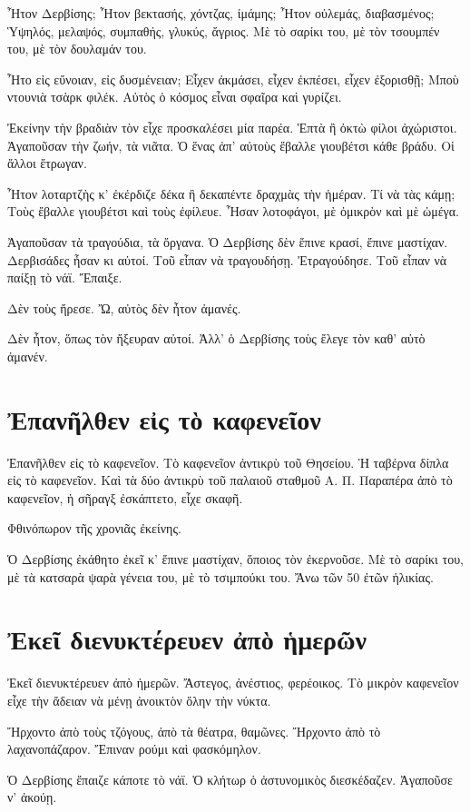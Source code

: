 \documentclass[11pt]{article}
\begin{document}
Ἦτον Δερβίσης; Ἦτον βεκτασής, χόντζας, ἰμάμης; Ἦτον οὐλεμάς, διαβασμένος; Ὑψηλός, μελαψός, συμπαθής, γλυκύς, ἄγριος. Μὲ τὸ σαρίκι του, μὲ τὸν τσουμπέν του, μὲ τὸν δουλαμάν του.

Ἦτο εἰς εὔνοιαν, εἰς δυσμένειαν; Εἶχεν ἀκμάσει, εἶχεν ἐκπέσει, εἶχεν ἐξορισθῇ; Μποὺ ντουνιὰ τσὰρκ φιλέκ. Αὐτὸς ὁ κόσμος εἶναι σφαῖρα καὶ γυρίζει.

Ἐκείνην τὴν βραδιὰν τὸν εἶχε προσκαλέσει μία παρέα. Ἑπτὰ ἢ ὀκτὼ φίλοι ἀχώριστοι. Ἀγαποῦσαν τὴν ζωήν, τὰ νιᾶτα. Ὁ ἕνας ἀπ' αὐτοὺς ἔβαλλε γιουβέτσι κάθε βράδυ. Οἱ ἄλλοι ἔτρωγαν.

Ἦτον λοταρτζὴς κ' ἐκέρδιζε δέκα ἢ δεκαπέντε δραχμὰς τὴν ἡμέραν. Τί νὰ τὰς κάμῃ; Τοὺς ἔβαλλε γιουβέτσι καὶ τοὺς ἐφίλευε. Ἦσαν λοτοφάγοι, μὲ ὀμικρὸν καὶ μὲ ὠμέγα.

Ἀγαποῦσαν τὰ τραγούδια, τὰ ὄργανα. Ὁ Δερβίσης δὲν ἔπινε κρασί, ἔπινε μαστίχαν. Δερβισάδες ἦσαν κι αὐτοί. Τοῦ εἶπαν νὰ τραγουδήσῃ. Ἐτραγούδησε. Τοῦ εἶπαν νὰ παίξῃ τὸ νάϊ. Ἔπαιξε.

Δὲν τοὺς ἤρεσε. Ὤ, αὐτὸς δὲν ἦτον ἀμανές.

Δὲν ἦτον, ὅπως τὸν ἤξευραν αὐτοί. Ἀλλ' ὁ Δερβίσης τοὺς ἔλεγε τὸν καθ' αὑτὸ ἀμανέν.

\section{Ἐπανῆλθεν εἰς τὸ καφενεῖον}
\label{sec:org26ae02f}
Ἐπανῆλθεν εἰς τὸ καφενεῖον. Τὸ καφενεῖον ἀντικρὺ τοῦ Θησείου. Ἡ ταβέρνα δίπλα εἰς τὸ καφενεῖον. Καὶ τὰ δύο ἀντικρὺ τοῦ παλαιοῦ σταθμοῦ Α. Π. Παραπέρα ἀπὸ τὸ καφενεῖον, ἡ σῆραγξ ἐσκάπτετο, εἶχε σκαφῆ.

Φθινόπωρον τῆς χρονιᾶς ἐκείνης.

Ὁ Δερβίσης ἐκάθητο ἐκεῖ κ' ἔπινε μαστίχαν, ὅποιος τὸν ἐκερνοῦσε. Μὲ τὸ σαρίκι του, μὲ τὰ κατσαρὰ ψαρὰ γένεια του, μὲ τὸ τσιμπούκι του. Ἄνω τῶν 50 ἐτῶν ἡλικίας.

\section{Ἐκεῖ διενυκτέρευεν ἀπὸ ἡμερῶν}
\label{sec:org6acefb5}
Ἐκεῖ διενυκτέρευεν ἀπὸ ἡμερῶν. Ἄστεγος, ἀνέστιος, φερέοικος. Τὸ μικρὸν καφενεῖον εἶχε τὴν ἄδειαν νὰ μένῃ ἀνοικτὸν ὅλην τὴν νύκτα.

Ἤρχοντο ἀπὸ τοὺς τζόγους, ἀπὸ τὰ θέατρα, θαμῶνες. Ἤρχοντο ἀπὸ τὸ λαχανοπάζαρον. Ἔπιναν ρούμι καὶ φασκόμηλον.

Ὁ Δερβίσης ἔπαιζε κάποτε τὸ νάϊ. Ὁ κλήτωρ ὁ ἀστυνομικὸς διεσκέδαζεν. Ἀγαποῦσε ν' ἀκούῃ.
\end{document}
